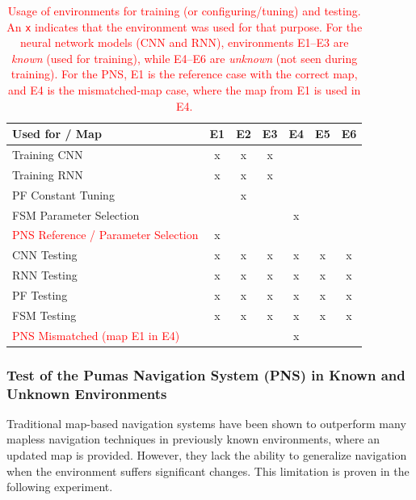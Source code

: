 \documentclass[robotics,article,submit,pdftex,moreauthors]{Definitions/mdpi}
\begin{document}
\begin{table}[htbp]
\centering
\caption{\textcolor{red}{Usage of environments for training (or configuring/tuning) and testing. An \texttt{x} indicates that the environment was used for that purpose. For the neural network models (CNN and RNN), environments E1–E3 are \textit{known} (used for training), while E4–E6 are \textit{unknown} (not seen during training). \textcolor{red}{For the PNS, E1 is the reference case with the correct map, and E4 is the mismatched-map case, where the map from E1 is used in E4.}}}
\label{tab:map_tasks}
\vspace{2.5pt}
\begin{tabular}{|l|c|c|c|c|c|c|}
\hline
\textbf{Used for / Map} & \textbf{E1} & \textbf{E2} & \textbf{E3} & \textbf{E4} & \textbf{E5} & \textbf{E6} \\
\hline
Training CNN               &  x  &  x  &  x  &     &     &     \\
\hline
Training RNN               &  x  &  x  &  x  &     &     &     \\
\hline
PF Constant Tuning         &     &  x  &     &     &     &     \\
\hline
FSM Parameter Selection    &     &     &     &  x  &     &     \\
\hline
\textcolor{red}{PNS Reference / Parameter Selection} &  x  &     &     &     &     &     \\
\hline
CNN Testing                &  x  &  x  &  x  &  x  &  x  &  x  \\
\hline
RNN Testing                &  x  &  x  &  x  &  x  &  x  &  x  \\
\hline
PF Testing                 &  x  &  x  &  x  &  x  &  x  &  x  \\
\hline
FSM Testing                &  x  &  x  &  x  &  x  &  x  &  x  \\
\hline
\textcolor{red}{PNS Mismatched (map E1 in E4)} &     &     &     &  x  &     &     \\
\hline
\end{tabular}
\end{table}

\subsubsection{Test of the Pumas Navigation System (PNS) in Known and Unknown Environments}\label{subsec:pns_test}

Traditional map-based navigation systems have been shown to outperform many mapless navigation techniques in previously known environments, where an updated map is provided. However, they lack the ability to generalize navigation when the environment suffers significant changes. This limitation is proven in the following experiment.
\end{document}
